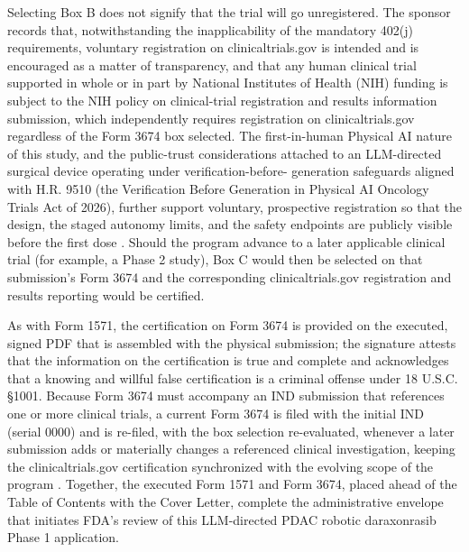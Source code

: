 Selecting Box B does not signify that the trial will go unregistered.
The sponsor records that, notwithstanding the inapplicability of the
mandatory 402(j) requirements, voluntary registration on
clinicaltrials.gov is intended and is encouraged as a matter of
transparency, and that any human clinical trial supported in whole or in
part by National Institutes of Health (NIH) funding is subject to the NIH
policy on clinical-trial registration and results information submission,
which independently requires registration on clinicaltrials.gov
regardless of the Form 3674 box selected. The first-in-human Physical AI
nature of this study, and the public-trust considerations attached to an
LLM-directed surgical device operating under verification-before-
generation safeguards aligned with H.R. 9510 (the Verification Before
Generation in Physical AI Oncology Trials Act of 2026), further support
voluntary, prospective registration so that the design, the staged
autonomy limits, and the safety endpoints are publicly visible before the
first dose \cite{congress9510, clintrustpai, paipredict4x}. Should the
program advance to a later applicable clinical trial (for example, a
Phase 2 study), Box C would then be selected on that submission's Form
3674 and the corresponding clinicaltrials.gov registration and results
reporting would be certified.

As with Form 1571, the certification on Form 3674 is provided on the
executed, signed PDF that is assembled with the physical submission; the
signature attests that the information on the certification is true and
complete and acknowledges that a knowing and willful false certification
is a criminal offense under 18 U.S.C. \S 1001. Because Form 3674 must
accompany an IND submission that references one or more clinical trials,
a current Form 3674 is filed with the initial IND (serial 0000) and is
re-filed, with the box selection re-evaluated, whenever a later
submission adds or materially changes a referenced clinical
investigation, keeping the clinicaltrials.gov certification synchronized
with the evolving scope of the program \cite{phase1guidance,
paisitedocpk}. Together, the executed Form 1571 and Form 3674, placed
ahead of the Table of Contents with the Cover Letter, complete the
administrative envelope that initiates FDA's review of this LLM-directed
PDAC robotic daraxonrasib Phase 1 application.
